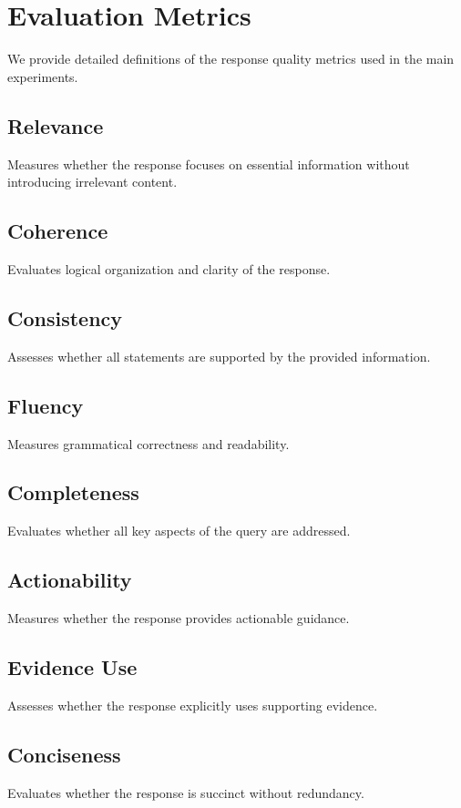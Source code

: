 \appendix

\section{Evaluation Metrics}
\label{app:metrics}

We provide detailed definitions of the response quality metrics used in the main experiments.

\subsection{Relevance}
Measures whether the response focuses on essential information without introducing irrelevant content.

\subsection{Coherence}
Evaluates logical organization and clarity of the response.

\subsection{Consistency}
Assesses whether all statements are supported by the provided information.

\subsection{Fluency}
Measures grammatical correctness and readability.

\subsection{Completeness}
Evaluates whether all key aspects of the query are addressed.

\subsection{Actionability}
Measures whether the response provides actionable guidance.

\subsection{Evidence Use}
Assesses whether the response explicitly uses supporting evidence.

\subsection{Conciseness}
Evaluates whether the response is succinct without redundancy.